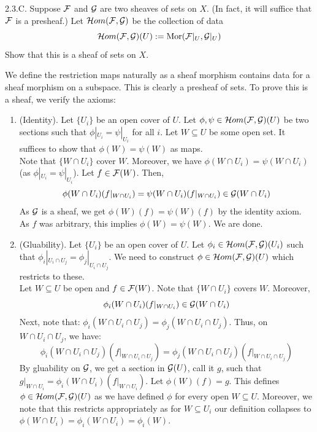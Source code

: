 \begin{exercise}{2.3.C.} 
Suppose $\mathcal{F}$ and $\mathcal{G}$ are two sheaves of sets on $X$.
(In fact, it will suffice that $\mathcal{F}$ is a presheaf.)
Let $\mathcal{H}om(\mathcal{F},\mathcal{G})$ be the collection of data
\[ \mathcal{H}om(\mathcal{F},\mathcal{G})(U) := \mathrm{Mor}(\mathcal{F}|_U, \mathcal{G}|_U) \]
Show that this is a sheaf of sets on $X$.
\end{exercise}
\begin{solution}
    We define the restriction maps naturally as a sheaf morphism contains data for a sheaf morphism on a subspace. This is clearly a presheaf of sets. To prove this is a sheaf, we verify the axioms:
    \begin{enumerate}[itemsep=1pt, topsep=1pt]
        \item (Identity). Let $\{U_i\}$ be an open cover of $U$. Let $\phi, \psi \in \mathcal{H} om(\mathcal{F}, \mathcal{G})(U)$ be two sections such that $\phi|_{U_i} = \psi|_{U_i}$ for all $i$. Let $W \subseteq U$ be some open set. It suffices to show that $\phi(W) = \psi(W)$ as maps. \\ 
        Note that $\{W \cap U_i\}$ cover $W$. Moreover, we have $\phi(W \cap U_i) = \psi(W \cap U_i)$ (as $\phi|_{U_i} = \psi|_{U_i}$). Let $f \in \mathcal{F}(W)$. Then, 
        \[ \phi(W \cap U_i)(f|_{W \cap U_i}) = \psi(W \cap U_i)(f|_{W \cap U_i}) \in \mathcal{G}(W \cap U_i)\]
        As $\mathcal{G}$ is a sheaf, we get $\phi(W)(f) = \psi(W)(f)$ by the identity axiom. As $f$ was arbitrary, this implies $\phi(W) = \psi(W)$. We are done.  
        \item (Gluability). Let $\{U_i\}$ be an open cover of $U$. Let $\phi_i \in \mathcal{H} om(\mathcal{F}, \mathcal{G})(U_i)$ such that $\phi_i|_{U_i \cap U_j} = \phi_j|_{U_i \cap U_j}$. We need to construct $\phi \in \mathcal{H} om(\mathcal{F}, \mathcal{G})(U)$ which restricts to these. \\
        Let $W \subseteq U$ be open and $f \in \mathcal{F}(W)$. Note that $\{ W \cap U_i\}$ covers $W$. Moreover,  
        \[ \phi_i(W \cap U_i)(f|_{W \cap U_i}) \in \mathcal{G}(W \cap U_i)\]
        Next, note that: $\phi_i(W \cap U_i \cap U_j) = \phi_j(W \cap U_i \cap U_j)$. Thus, on $W \cap U_i \cap U_j$, we have:
        \[ \phi_i(W \cap U_i \cap U_j)(f|_{W \cap U_i \cap U_j}) = \phi_j(W \cap U_i \cap U_j)(f|_{W \cap U_i \cap U_j})\]
        By gluability on $\mathcal{G}$, we get a section in $\mathcal{G}(U)$, call it $g$, such that $g|_{W \cap U_i} = \phi_i(W \cap U_i)(f|_{W \cap U_i})$. Let $\phi(W)(f) = g$. This defines $\phi \in \mathcal{H} om(\mathcal{F}, \mathcal{G})(U)$ as we have defined $\phi$ for every open $W \subseteq U$. Moreover, we note that this restricts appropriately as for $W \subseteq U_i$ our definition collapses to $\phi(W \cap U_i) = \phi_i(W \cap U_i) = \phi_i(W)$. 
    \end{enumerate} 
\end{solution}

